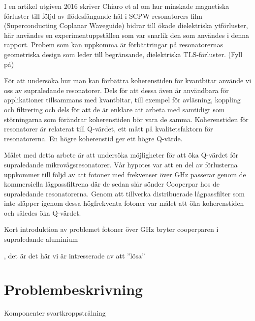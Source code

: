 \documentclass[main.tex]{subfiles}
\begin{document}
I en artikel utgiven 2016 skriver Chiaro et al om hur minskade magnetiska förluster till följd av flödesfångande hål i SCPW-resonatorers film (Superconducting Coplanar Waveguide) bidrar till ökade dielektriska ytförluster, här användes en experimentuppställen som var snarlik den som användes i denna rapport. Probem som kan uppkomma är förbättringar på resonatorernas geometriska design som leder till begränsande, dielektriska TLS-förluster. (Fyll på)


För att undersöka hur man kan förbättra koherenstiden för kvantbitar använde vi oss av supraledande resonatorer. Dels för att dessa även är användbara för applikationer tillsammans med kvantbitar, till exempel för avläsning, koppling och filtrering \cite{placeholder} och dels för att de är enklare att arbeta med samtidigt som störningarna som förändrar koherenstiden bör vara de samma\cite{Oliver2013}. Koherenstiden för resonatorer är relaterat till Q-värdet, ett mått på kvalitetsfaktorn för resonatorerna. En högre koherenstid ger ett högre Q-värde.


Målet med detta arbete är att undersöka möjligheter för att öka Q-värdet för supraledande mikrovågsresonatorer. Vår hypotes var att en del av förlusterna uppkommer till följd av att fotoner med frekvenser över \unit[100]{GHz} passerar genom de kommersiella lågpassfiltrena där de sedan slår sönder Cooperpar hos de supraledande resonatorerna. Genom att tillverka distribuerade lågpassfilter som inte släpper igenom dessa högfrekventa fotoner var målet att öka koherenstiden och således öka Q-värdet.





Kort introduktion av problemet
fotoner över \unit[88]{GHz} bryter cooperparen i supraledande aluminium

, det är det här vi är intresserade av att ''lösa''

\section{Problembeskrivning}
Komponenter svartkroppstrålning
\end{document}
